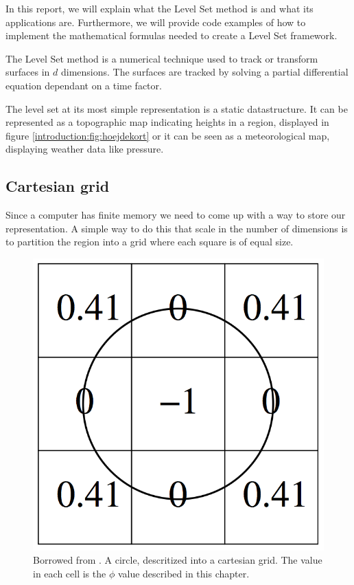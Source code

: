 In this report, we will explain what the Level Set method is and what its applications are. Furthermore, we will provide code examples of how to implement the mathematical formulas needed to create a Level Set framework. 

The Level Set method is a numerical technique used to track or transform surfaces in $d$ dimensions. The surfaces are tracked by solving a partial differential equation dependant on a time factor. 

The level set at its most simple representation is a static datastructure. It can be represented as a topographic map indicating heights in a region, displayed in figure \vref{introduction:fig:hoejdekort} or it can be seen as a meteorological map, displaying weather data like pressure.



\subsection{Cartesian grid}

Since a computer has finite memory we need to come up with a way to store our representation. A simple way to do this that scale in the number of dimensions is to partition the region into a grid where each square is of equal size.

\begin{figure}[htb]
  \centering
  \includegraphics[scale=0.3]{imgs/cartesiangrid.png}
  \caption{Borrowed from . A circle, descritized into a cartesian grid. The value in each cell is the $\phi$ value described in this chapter.}
  \label{introduction:fig:cartesiangrid}
\end{figure}

